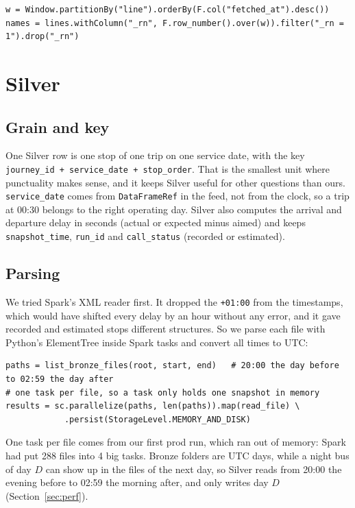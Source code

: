 \documentclass[11pt,a4paper]{article}
\newcommand{\code}[1]{\texttt{#1}}
\begin{document}
\begin{lstlisting}
w = Window.partitionBy("line").orderBy(F.col("fetched_at").desc())
names = lines.withColumn("_rn", F.row_number().over(w)).filter("_rn = 1").drop("_rn")
\end{lstlisting}

\section{Silver}
\label{sec:silver}

\subsection*{Grain and key}

One Silver row is one stop of one trip on one service date, with the key
\code{journey\_id + service\_date + stop\_order}. That is the smallest unit where punctuality
makes sense, and it keeps Silver useful for other questions than ours. \code{service\_date}
comes from \code{DataFrameRef} in the feed, not from the clock, so a trip at 00:30 belongs to
the right operating day. Silver also computes the arrival and departure delay in seconds
(actual or expected minus aimed) and keeps \code{snapshot\_time}, \code{run\_id} and
\code{call\_status} (recorded or estimated).

\subsection*{Parsing}

We tried Spark's XML reader first. It dropped the \code{+01:00} from the timestamps, which
would have shifted every delay by an hour without any error, and it gave recorded and
estimated stops different structures. So we parse each file with Python's ElementTree inside
Spark tasks and convert all times to UTC:

\begin{lstlisting}
paths = list_bronze_files(root, start, end)   # 20:00 the day before to 02:59 the day after
# one task per file, so a task only holds one snapshot in memory
results = sc.parallelize(paths, len(paths)).map(read_file) \
            .persist(StorageLevel.MEMORY_AND_DISK)
\end{lstlisting}

One task per file comes from our first prod run, which ran out of memory: Spark had put 288
files into 4 big tasks. Bronze folders are UTC days, while a night bus of day $D$ can show up
in the files of the next day, so Silver reads from 20:00 the evening before to 02:59 the
morning after, and only writes day $D$ (Section~\ref{sec:perf}).
\end{document}
